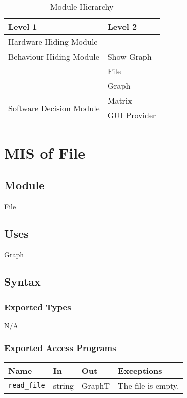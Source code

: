 \documentclass[12pt, titlepage]{article}
\begin{document}
\begin{table}[h!]
\centering
\begin{tabular}{p{} p{}}
\toprule
\textbf{Level 1} & \textbf{Level 2}\\
\midrule

{Hardware-Hiding Module} & - \\
\midrule

{Behaviour-Hiding Module} & Show Graph \\ & File\\ &Graph\\
\midrule

\multirow{3}{0.3\textwidth}{Software Decision Module} & Matrix\\ & GUI Provider\\
\bottomrule

\end{tabular}
\caption{Module Hierarchy}
\label{TblMH}
\end{table}

\newpage

\section{MIS of File } \label{Module} 


\subsection{Module}

File
\subsection{Uses}
Graph 
\subsection{Syntax}

\subsubsection{Exported Types}
N/A
\subsubsection{Exported Access Programs}

\begin{center}
\begin{tabular}{p{2cm} p{2cm} p{2cm} p{4cm}}
\hline
\textbf{Name} & \textbf{In} & \textbf{Out} & \textbf{Exceptions} \\
\hline
\texttt{read\_file} & string & GraphT & The file is empty. \\
\hline
\end{tabular}
\end{center}
\end{document}
